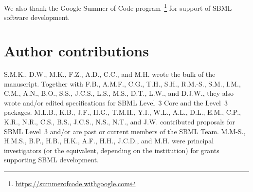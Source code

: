 \documentclass{sbml-paper}
\begin{document}
We also thank the Google Summer of Code program~\footnote{\url{https://summerofcode.withgoogle.com}} for support of SBML software development.


\section*{Author contributions}

S.M.K., D.W., M.K., F.Z., A.D., C.C., and M.H. wrote the bulk of the manuscript.  Together with F.B., A.M.F., C.G., T.H., S.H., R.M.-S., S.M., I.M., C.M., A.N., B.O., S.S., J.C.S., L.S., M.S., D.T., L.W., and D.J.W., they also wrote and/or edited specifications for SBML Level~3 Core and the Level~3 packages.  M.L.B., K.B., J.F., H.G., T.M.H., Y.I., W.L., A.L., D.L., E.M., C.P., K.R., N.R., C.S., B.S., J.C.S., N.S., N.T., and J.W. contributed proposals for SBML Level~3 and/or are past or current members of the SBML Team.  M.M-S., H.M.S., B.P., H.B., H.K., A.F., H.H., J.C.D., and M.H. were principal investigators (or the equivalent, depending on the institution) for grants supporting SBML development.



\clearpage



\end{document}
